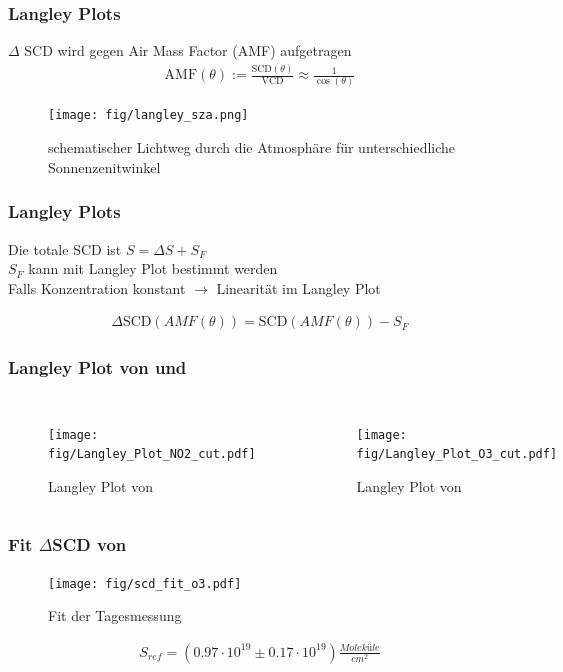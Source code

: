 \documentclass{beamer}
\begin{document}
\begin{frame}
    \frametitle{Langley Plots}
    $\Delta$ SCD wird gegen Air Mass Factor (AMF) aufgetragen\\
    
    \begin{align}
        \text{AMF}(\theta) := \frac{\text{SCD}(\theta)}{\text{VCD}} \approx \frac{1}{\cos (\theta)}
    \end{align}
    
    \begin{figure}
        \texttt{[image: fig/langley\_sza.png]}
        \caption{schematischer Lichtweg durch die Atmosphäre für unterschiedliche Sonnenzenitwinkel \cite{atm_script}}
    \end{figure}
\end{frame}

\begin{frame}
    \frametitle{Langley Plots}
    Die totale SCD ist $S = \Delta S + S_F$\\
    $S_F$ kann mit Langley Plot bestimmt werden\\
    Falls Konzentration konstant $\to$ Linearität im Langley Plot
    
    \begin{align}
    	\Delta \text{SCD}(AMF(\theta)) = \text{SCD}(AMF(\theta)) - S_F
    \end{align}
\end{frame}

\begin{frame}
    \frametitle{Langley Plot von  und }
    \begin{columns}
    	\begin{figure}
    		\texttt{[image: fig/Langley\_Plot\_NO2\_cut.pdf]}
            \caption{Langley Plot von }   
	 	\end{figure}
 	    \begin{figure}
 	    	\texttt{[image: fig/Langley\_Plot\_O3\_cut.pdf]}
 	        \caption{Langley Plot von }
     	\end{figure} 
    \end{columns} 	
\end{frame}

\begin{frame}
    \frametitle{Fit $\Delta$SCD von }
    \vspace{-0.2cm}
    \begin{figure}
    	\texttt{[image: fig/scd\_fit\_o3.pdf]}
    	\caption{Fit der Tagesmessung }
    \end{figure}
	\vspace{-0.5cm}
	\begin{align}
		S_{ref}= (0.97 \cdot 10^{19}\pm 0.17 \cdot 10^{19}) \si{\frac{Moleküle}{cm^2}}
	\end{align}
\end{frame}
\end{document}
